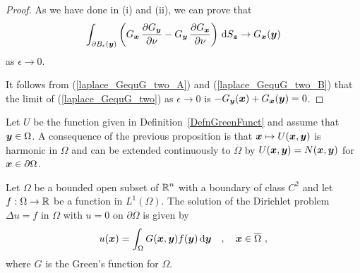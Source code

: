\begin{proof}
As we have done in (i) and (ii), we can prove that
\begin{equation} \label{laplace_GequG_two_B}
\int_{\partial B_{\epsilon}({\bm{y}})}
\left( G_{{\bm{x}}}\,\frac{\partial{G_{{\bm{y}}}}}{\partial \nu} 
- G_{{\bm{y}}}\,\frac{\partial{G_{{\bm{x}}}}}{\partial \nu} \right) \,\mathrm{d}{S}_{{\bm{z}}}
\to G_{{\bm{x}}}({\bm{y}})
\end{equation}
as $\epsilon \to 0$.

It follows from (\ref{laplace_GequG_two_A}) and
(\ref{laplace_GequG_two_B}) that the limit of
(\ref{laplace_GequG_two}) as $\epsilon \to 0$ is
$-G_{{\bm{y}}}({\bm{x}}) + G_{{\bm{x}}}({\bm{y}}) = 0$.
\end{proof}

Let $U$ be the function given in Definition~\ref{DefnGreenFunct} and
assume that ${\bm{y}} \in \Omega$.  A consequence of the previous
proposition is that ${\bm{x}} \mapsto U({\bm{x}},{\bm{y}})$ is harmonic
in $\Omega$ and can be extended continuously to $\overline{\Omega}$ by
$U({\bm{x}},{\bm{y}}) = N({\bm{x}},{\bm{y}})$ for
${\bm{x}} \in \partial \Omega$.

\begin{theorem} \label{laplace_dirichlet1}
Let $\Omega$ be a bounded open subset of $\displaystyle \mathbb{R}^n$ with a
boundary of class $\displaystyle C^2$ and let
$f:\Omega \rightarrow \mathbb{R}$ be a function in
$\displaystyle L^1(\Omega)$.  The solution of the Dirichlet problem
$\Delta u = f$ in $\Omega$ with $u=0$ on $\partial \Omega$ is given by
\[
u({\bm{x}}) = \int_{\Omega} G({\bm{x}},{\bm{y}})f({\bm{y}}) \,\mathrm{d}{{\bm{y}}}
\quad , \quad {\bm{x}} \in \overline{\Omega} \ ,
\]
where $G$ is the Green's function for $\Omega$.
\end{theorem}

